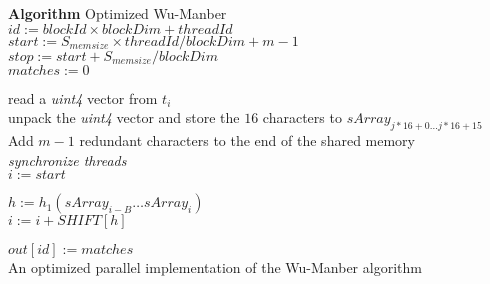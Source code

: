 \documentclass{ws-ijait}
\begin{document}
\begin{algorithm}[h]

\textbf{Algorithm} Optimized Wu-Manber\\

$id := blockId \times blockDim + threadId$\\
$start := S_{memsize} \times threadId / blockDim + m - 1$\\
$stop := start + S_{memsize} / blockDim$\\
$matches := 0$\\


 {

	 {
		 {
			read a \textit{uint4} vector from $t_{i}$\\
			unpack the \textit{uint4} vector and store the $16$ characters to $sArray_{j * 16 + 0 \ldots j * 16 + 15}$\\
		}
	}
	Add $m - 1$ redundant characters to the end of the shared memory\\
	\textit{synchronize threads}\\

	$i := start$\\

	 {

		$h := h_1(sArray_{i - B}\ldots sArray_i)$\\
	
		 {
			$i := i + SHIFT[h]$\\
		}
		
	}
}

$out[id] := matches$\\

\caption{An optimized parallel implementation of the Wu-Manber algorithm}
\label{compl:cuda_WM_optimized_implementation}
\end{algorithm}
\end{document}
